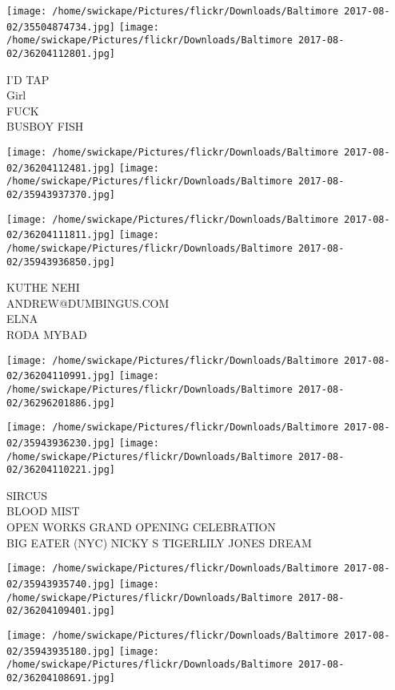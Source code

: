 \documentclass[10pt,letterpaper]{article}
\begin{document}
\texttt{[image: /home/swickape/Pictures/flickr/Downloads/Baltimore 2017-08-02/35504874734.jpg]}
\texttt{[image: /home/swickape/Pictures/flickr/Downloads/Baltimore 2017-08-02/36204112801.jpg]}

I'D TAP\\
Girl\\
FUCK\\
BUSBOY FISH\\
\pagebreak

\texttt{[image: /home/swickape/Pictures/flickr/Downloads/Baltimore 2017-08-02/36204112481.jpg]}
\texttt{[image: /home/swickape/Pictures/flickr/Downloads/Baltimore 2017-08-02/35943937370.jpg]}

\texttt{[image: /home/swickape/Pictures/flickr/Downloads/Baltimore 2017-08-02/36204111811.jpg]}
\texttt{[image: /home/swickape/Pictures/flickr/Downloads/Baltimore 2017-08-02/35943936850.jpg]}

KUTHE NEHI\\
ANDREW@DUMBINGUS.COM\\
ELNA\\
RODA MYBAD\\
\pagebreak

\texttt{[image: /home/swickape/Pictures/flickr/Downloads/Baltimore 2017-08-02/36204110991.jpg]}
\texttt{[image: /home/swickape/Pictures/flickr/Downloads/Baltimore 2017-08-02/36296201886.jpg]}

\texttt{[image: /home/swickape/Pictures/flickr/Downloads/Baltimore 2017-08-02/35943936230.jpg]}
\texttt{[image: /home/swickape/Pictures/flickr/Downloads/Baltimore 2017-08-02/36204110221.jpg]}

SIRCUS\\
BLOOD MIST\\
OPEN WORKS GRAND OPENING CELEBRATION\\
BIG EATER (NYC) NICKY S TIGERLILY JONES DREAM\\
\pagebreak

\texttt{[image: /home/swickape/Pictures/flickr/Downloads/Baltimore 2017-08-02/35943935740.jpg]}
\texttt{[image: /home/swickape/Pictures/flickr/Downloads/Baltimore 2017-08-02/36204109401.jpg]}

\texttt{[image: /home/swickape/Pictures/flickr/Downloads/Baltimore 2017-08-02/35943935180.jpg]}
\texttt{[image: /home/swickape/Pictures/flickr/Downloads/Baltimore 2017-08-02/36204108691.jpg]}
\end{document}
